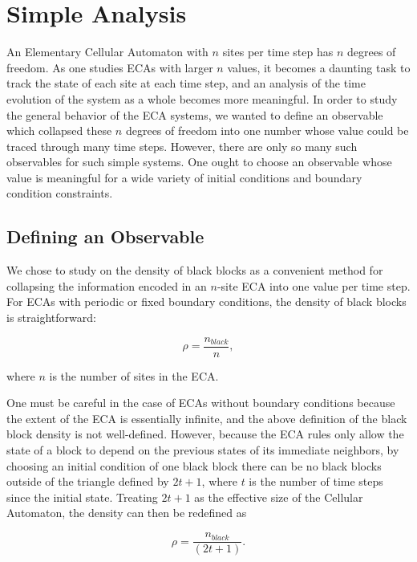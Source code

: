 \section{Simple Analysis}


An Elementary Cellular Automaton with $n$ sites per time step has
$n$ degrees of freedom.
As one studies ECAs with larger $n$ values, it becomes a daunting
task to track the state of each site at each time step, and an
analysis of the time evolution of the system as a whole becomes more
meaningful.
In order to study the general behavior of the ECA systems, we wanted
to define an observable which collapsed these $n$ degrees of freedom
into one number whose value could be traced through many time steps.
However, there are only so many such observables for such simple
systems.
One ought to choose an observable whose value is meaningful for a wide
variety of initial conditions and boundary condition constraints.


\subsection{Defining an Observable}

We chose to study on the density of black blocks as a convenient
method for collapsing the information encoded in an $n$-site ECA into
one value per time step.
For ECAs with periodic or fixed boundary conditions, the density of
black blocks is straightforward:

\begin{equation}
    \rho = \frac{n_{black}}{n},
\end{equation}

\noindent where $n$ is the number of sites in the ECA.

One must be careful in the case of ECAs without boundary conditions
because the extent of the ECA is essentially infinite, and the above
definition of the black block density is not well-defined.
However, because the ECA rules only allow the state of a block to
depend on the previous states of its immediate neighbors, by choosing
an initial condition of one black block there can be no black blocks
outside of the triangle defined by $2t+1$, where $t$ is the number of
time steps since the initial state.
Treating $2t+1$ as the effective size of the Cellular Automaton, the
density can then be redefined as

\begin{equation}
    \rho = \frac{n_{black}}{(2t+1)}.
\end{equation}


